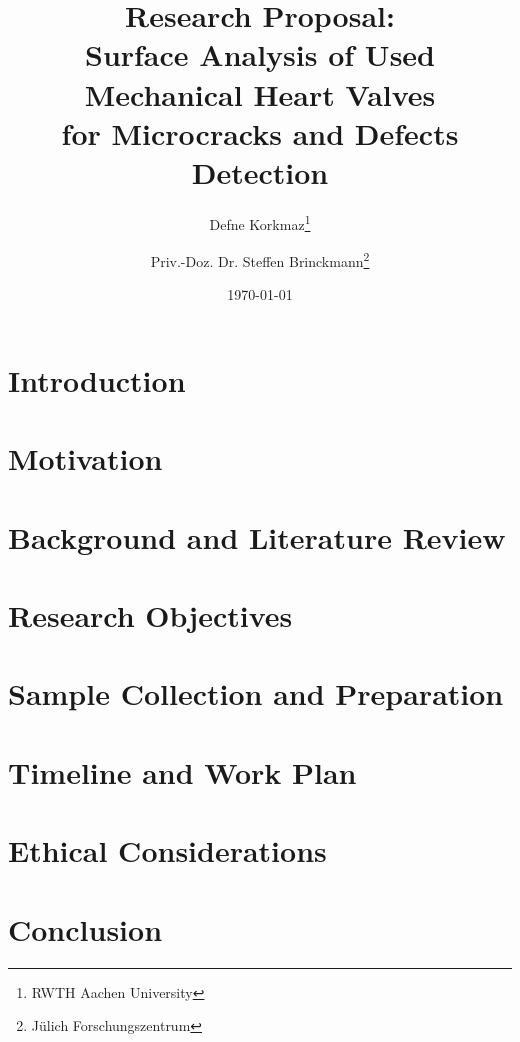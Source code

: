 \documentclass{article}
\title{Research Proposal:\\Surface Analysis of Used Mechanical Heart Valves\\for Microcracks and Defects Detection\\}
\author{Defne Korkmaz\thanks{RWTH Aachen University} \and Priv.-Doz. Dr. Steffen Brinckmann\thanks{Jülich Forschungszentrum}}
\date{\today}
\begin{document}
\maketitle
\vfill
\pagebreak
\tableofcontents
\pagebreak
\section{Introduction}

\section{Motivation}

\section{Background and Literature Review}

\section{Research Objectives}

\pagebreak
\section{Sample Collection and Preparation}

\section{Timeline and Work Plan}

\section{Ethical Considerations}

\section{Conclusion}

\pagebreak
\printbibliography
\end{document}
